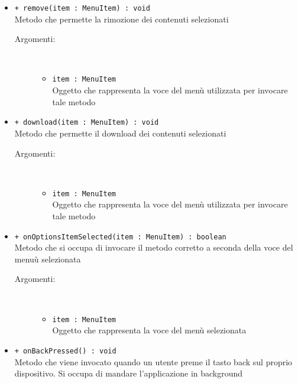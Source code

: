 \documentclass[../Tesi.tex]{subfiles}
\begin{document}
\begin{description}
\begin{itemize}
				\item \texttt{+ remove(item : MenuItem) : void}\\
				Metodo che permette la rimozione dei contenuti selezionati
				\begin{description}
					\item[Argomenti:] \
					\begin{itemize}
						\item \texttt{item : MenuItem}\\
						Oggetto che rappresenta la voce del menù utilizzata per invocare tale metodo
					\end{itemize}
				\end{description}

				\item \texttt{+ download(item : MenuItem) : void}\\
				Metodo che permette il download dei contenuti selezionati
				\begin{description}
					\item[Argomenti:] \
					\begin{itemize}
						\item \texttt{item : MenuItem}\\
						Oggetto che rappresenta la voce del menù utilizzata per invocare tale metodo
					\end{itemize}
				\end{description}

				\item \texttt{+ onOptionsItemSelected(item : MenuItem) : boolean}\\
				Metodo che si occupa di invocare il metodo corretto a seconda della voce del menuù selezionata
				\begin{description}
					\item[Argomenti:] \
					\begin{itemize}
						\item \texttt{item : MenuItem}\\
						Oggetto che rappresenta la voce del menù selezionata
					\end{itemize}
				\end{description}

				\item \texttt{+ onBackPressed() : void}\\
				Metodo che viene invocato quando un utente preme il tasto back sul proprio dispositivo. Si occupa di mandare l'applicazione in background
			\end{itemize}
		\end{description}
\end{document}

